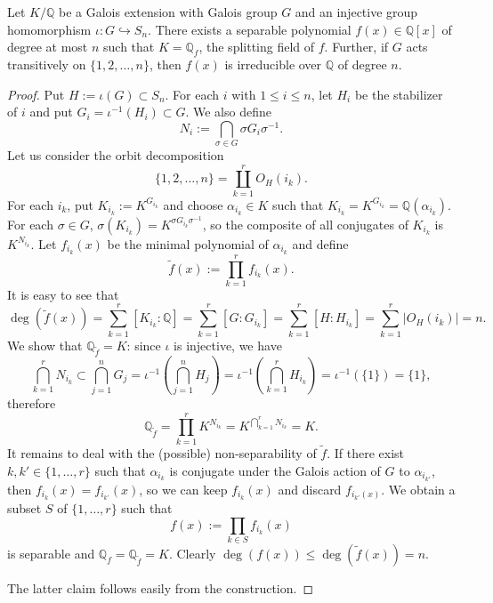 \documentclass[10pt,a4paper]{amsart}
\newcommand{\Q}{\mathbb{Q}}
\renewcommand{\le}{\leqslant}
\begin{document}
\begin{lemma}\label{poly}Let $K/\Q$ be a Galois extension with Galois group $G$
  and an injective group homomorphism $\iota:G\hookrightarrow S_n$.
  There exists a separable polynomial $f(x)\in\Q[x]$ of degree at most $n$
  such that $K=\Q_f$, the splitting field of $f$. Further, if $G$ acts transitively on $\{1,2,\ldots,n\}$, then $f(x)$ is irreducible over $\Q$ of degree $n$.
\end{lemma}

\begin{proof}Put $H:=\iota(G)\subset S_n$.
  For each $i$ with $1\le i\le n$, let $H_i$ be the stabilizer of $i$ and put
  $G_i=\iota^{-1}(H_i)\subset G$. We also define
  \begin{equation*}
    N_i:=\bigcap_{\sigma\in G}\sigma G_i \sigma^{-1}.
  \end{equation*}
  Let us consider the orbit decomposition
  \begin{equation*}
    \{1,2,\ldots,n\}=\coprod_{k=1}^r O_H(i_k).
  \end{equation*}
  For each $i_k$,
  put $K_{i_k}:=K^{G_{i_k}}$ and choose $\alpha_{i_k}\in K$ such that
  $K_{i_k}=K^{G_{i_k}}=\Q(\alpha_{i_k})$. For each $\sigma \in G$, $\sigma(K_{i_k})=
    K^{\sigma G_{i_k}\sigma^{-1}}$, so the composite of all conjugates of $K_{i_k}$
  is $K^{N_{i_k}}$.
  Let $f_{i_k}(x)$ be the minimal polynomial of $\alpha_{i_k}$ and define
  \begin{equation}\label{g(x)}
    \widetilde{f}(x):=\prod_{k=1}^r f_{i_k}(x).
  \end{equation}
  It is easy to see that
  \begin{equation*}
    \deg(\widetilde{f}(x))=\sum_{k=1}^r[K_{i_k}:\Q]=\sum_{k=1}^r[G:G_{i_k}]=\sum_{k=1}^r[H:H_{i_k}]=
    \sum_{k=1}^r|O_H(i_k)|=n.
  \end{equation*}
  We show that $\Q_{\widetilde{f}}=K$: since $\iota$ is injective, we have
  \begin{equation*}
    \bigcap_{k=1}^r N_{i_k}\subset \bigcap_{j=1}^n G_{j}=\iota^{-1}(\bigcap_{j=1}^n H_j)
    =\iota^{-1}(\bigcap_{k=1}^r H_{i_k})=\iota^{-1}(\{1\})=\{1\},
  \end{equation*}
  therefore
  \begin{equation*}
    \Q_{\widetilde{f}}=\prod_{k=1}^r K^{N_{i_k}}=K^{\bigcap_{k=1}^r N_{i_k}}=K.
  \end{equation*}
  It remains to deal with the (possible) non-separability of $\widetilde{f}$.
  If there exist $k,k'\in\{1,\dots,r\}$ such that $\alpha_{i_k}$ is conjugate under the Galois action of $G$ to $\alpha_{i_{k'}}$, then $f_{i_k}(x)=f_{i_{k'}}(x)$, so we can keep $f_{i_k}(x)$ and discard $f_{i_{k'}(x)}$.
  We obtain a subset $S$ of $\{1,\ldots, r\}$ such that
  \begin{equation*}
    f(x):=\prod_{k\in S}f_{i_k}(x)
  \end{equation*}
  is separable and $\Q_f=\Q_{\widetilde{f}}=K$. Clearly
  $\deg(f(x))\le \deg(\widetilde{f}(x))=n$.

  The latter claim follows easily from the construction.
\end{proof}
\end{document}
